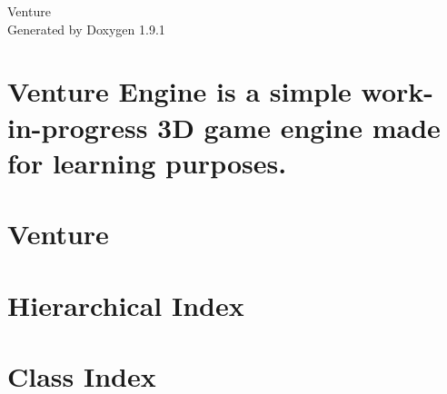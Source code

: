 \let\mypdfximage\pdfximage\def\pdfximage{\immediate\mypdfximage}\documentclass[twoside]{book}
\newcommand{\+}{\discretionary{\mbox{\scriptsize$\hookleftarrow$}}{}{}}
\newcommand{\clearemptydoublepage}{%
  \newpage{\pagestyle{empty}\cleardoublepage}%
}
\begin{document}
\raggedbottom

\hypersetup{pageanchor=false,
             bookmarksnumbered=true,
             pdfencoding=unicode
            }
\begin{titlepage}
\vspace*{7cm}
\begin{center}%
{\Large Venture }\\
\vspace*{1cm}
{\large Generated by Doxygen 1.9.1}\\
\end{center}
\end{titlepage}
\clearemptydoublepage
{}
\tableofcontents
\clearemptydoublepage
{}
\hypersetup{pageanchor=true}

\chapter{Venture Engine is a simple work-\/in-\/progress 3D game engine made for learning purposes.}
\label{index}\hypertarget{index}{}
\chapter{Venture}
\label{md__e___development__venture__r_e_a_d_m_e}

\chapter{Hierarchical Index}

\chapter{Class Index}

\end{document}
